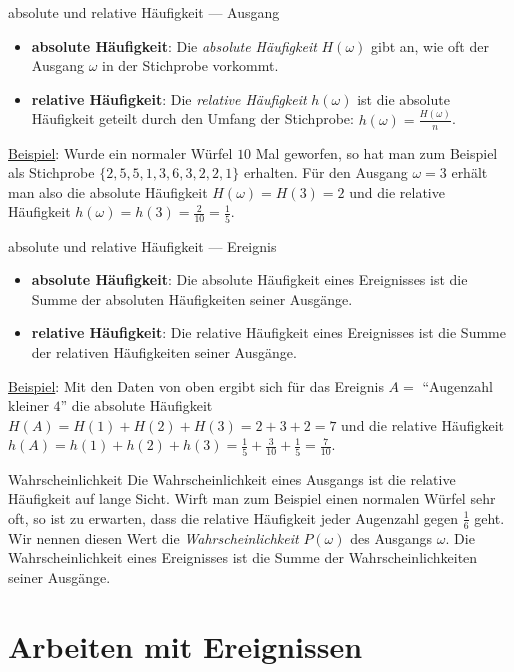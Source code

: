 \begin{bla}{absolute und relative Häufigkeit --- Ausgang}
  \begin{itemize}
    \item \textbf{absolute Häufigkeit}: Die \emph{absolute Häufigkeit} $H(\omega)$ gibt an, wie oft der Ausgang $\omega$ in der Stichprobe vorkommt.
    \item \textbf{relative Häufigkeit}: Die \emph{relative Häufigkeit} $h(\omega)$ ist die absolute Häufigkeit geteilt durch den Umfang der Stichprobe: $h(\omega)=\frac{H(\omega)}{n}$.
  \end{itemize}
  \underline{Beispiel}: Wurde ein normaler Würfel $10$ Mal geworfen, so hat man zum Beispiel als Stichprobe $\{2,5,5,1,3,6,3,2,2,1\}$ erhalten. Für den Ausgang $\omega=3$ erhält man also die absolute Häufigkeit $H(\omega)=H(3)=2$ und die relative Häufigkeit $h(\omega)=h(3)=\tfrac{2}{10}=\tfrac{1}{5}$.
\end{bla}

\begin{bla}{absolute und relative Häufigkeit --- Ereignis}
  \begin{itemize}
    \item \textbf{absolute Häufigkeit}: Die absolute Häufigkeit eines Ereignisses ist die Summe der absoluten Häufigkeiten seiner Ausgänge.
    \item \textbf{relative Häufigkeit}: Die relative Häufigkeit eines Ereignisses ist die Summe der relativen Häufigkeiten seiner Ausgänge.
  \end{itemize}
  \underline{Beispiel}: Mit den Daten von oben ergibt sich für das Ereignis $A=$ "`Augenzahl kleiner $4$"' die absolute Häufigkeit $H(A)=H(1)+H(2)+H(3)=2+3+2=7$ und die relative Häufigkeit $h(A)=h(1)+h(2)+h(3)=\tfrac{1}{5}+\tfrac{3}{10}+\tfrac{1}{5}=\tfrac{7}{10}$.
\end{bla}

\begin{bla}{Wahrscheinlichkeit}
  Die Wahrscheinlichkeit eines Ausgangs ist die relative Häufigkeit auf lange Sicht. Wirft man zum Beispiel einen normalen Würfel sehr oft, so ist zu erwarten, dass die relative Häufigkeit jeder Augenzahl gegen $\tfrac{1}{6}$ geht. Wir nennen diesen Wert die \emph{Wahrscheinlichkeit} $P(\omega)$ des Ausgangs $\omega$. Die Wahrscheinlichkeit eines Ereignisses ist die Summe der Wahrscheinlichkeiten seiner Ausgänge.
\end{bla}

\section{Arbeiten mit Ereignissen}

